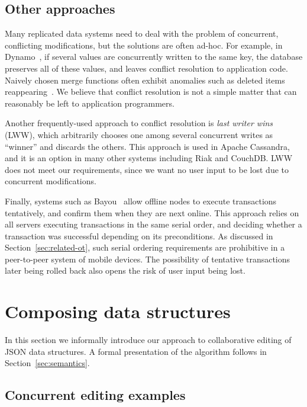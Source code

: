 \documentclass[10pt,journal,compsoc]{IEEEtran}
\begin{document}
\subsection{Other approaches}\label{sec:related-other}

Many replicated data systems need to deal with the problem of concurrent, conflicting modifications, but the solutions are often ad-hoc. For example, in Dynamo~\cite{DeCandia:2007ui}, if several values are concurrently written to the same key, the database preserves all of these values, and leaves conflict resolution to application code. Naively chosen merge functions often exhibit anomalies such as deleted items reappearing~\cite{DeCandia:2007ui}. We believe that conflict resolution is not a simple matter that can reasonably be left to application programmers.

Another frequently-used approach to conflict resolution is \emph{last writer wins} (LWW), which arbitrarily chooses one among several concurrent writes as ``winner'' and discards the others. This approach is used in Apache Cassandra, and it is an option in many other systems including Riak and CouchDB. LWW does not meet our requirements, since we want no user input to be lost due to concurrent modifications.

Finally, systems such as Bayou~\cite{Terry:1995dn} allow offline nodes to execute transactions tentatively, and confirm them when they are next online. This approach relies on all servers executing transactions in the same serial order, and deciding whether a transaction was successful depending on its preconditions. As discussed in Section~\ref{sec:related-ot}, such serial ordering requirements are prohibitive in a peer-to-peer system of mobile devices. The possibility of tentative transactions later being rolled back also opens the risk of user input being lost.


\section{Composing data structures}\label{sec:composing}

In this section we informally introduce our approach to collaborative editing of JSON data structures. A formal presentation of the algorithm follows in Section~\ref{sec:semantics}.

\subsection{Concurrent editing examples}\label{sec:examples}
\end{document}
